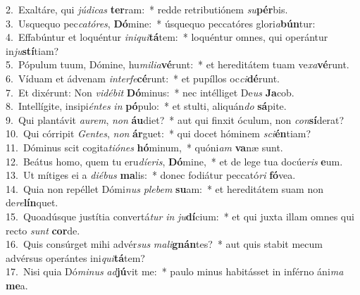 {2.~}Exaltáre, qui \textit{jú}\textit{di}\textit{cas} \textbf{ter}ram:~* redde retributiónem \textit{su}\textbf{pér}bis.\\
{3.~}Usquequo pec\textit{ca}\textit{tó}\textit{res}, \textbf{Dó}mine:~* úsquequo peccatóres glori\textit{a}\textbf{bún}tur:\\
{4.~}Effabúntur et loquéntur \textit{i}\textit{ni}\textit{qui}\textbf{tá}tem:~* loquéntur omnes, qui operántur in\textit{ju}\textbf{stí}tiam?\\
{5.~}Pópulum tuum, Dómine, hu\textit{mi}\textit{li}\textit{a}\textbf{vé}runt:~* et hereditátem tuam ve\textit{xa}\textbf{vé}runt.\\
{6.~}Víduam et ádvenam \textit{in}\textit{ter}\textit{fe}\textbf{cé}runt:~* et pupíllos oc\textit{ci}\textbf{dé}runt.\\
{7.~}Et dixérunt: Non \textit{vi}\textit{dé}\textit{bit} \textbf{Dó}minus:~* nec intélliget De\textit{us} \textbf{Ja}cob.\\
{8.~}Intellígite, insipi\textit{én}\textit{tes} \textit{in} \textbf{pó}pulo:~* et stulti, aliquán\textit{do} \textbf{sá}pite.\\
{9.~}Qui plantávit \textit{au}\textit{rem}, \textit{non} \textbf{áu}diet?~* aut qui finxit óculum, non \textit{con}\textbf{sí}derat?\\
{10.~}Qui córripit \textit{Gen}\textit{tes}, \textit{non} \textbf{ár}guet:~* qui docet hóminem \textit{sci}\textbf{én}tiam?\\
{11.~}Dóminus scit cogita\textit{ti}\textit{ó}\textit{nes} \textbf{hó}minum,~* quóni\textit{am} \textbf{va}næ sunt.\\
{12.~}Beátus homo, quem tu eru\textit{dí}\textit{e}\textit{ris}, \textbf{Dó}mine,~* et de lege tua docúe\textit{ris} \textbf{e}um.\\
{13.~}Ut mítiges ei a \textit{di}\textit{é}\textit{bus} \textbf{ma}lis:~* donec fodiátur peccató\textit{ri} \textbf{fó}vea.\\
{14.~}Quia non repéllet Dómi\textit{nus} \textit{ple}\textit{bem} \textbf{su}am:~* et hereditátem suam non de\textit{re}\textbf{lín}quet.\\
{15.~}Quoadúsque justítia convertá\textit{tur} \textit{in} \textit{ju}\textbf{dí}cium:~* et qui juxta illam omnes qui recto \textit{sunt} \textbf{cor}de.\\
{16.~}Quis consúrget mihi advér\textit{sus} \textit{ma}\textit{li}\textbf{gnán}tes?~* aut quis stabit mecum advérsus operántes ini\textit{qui}\textbf{tá}tem?\\
{17.~}Nisi quia Dó\textit{mi}\textit{nus} \textit{ad}\textbf{jú}vit me:~* paulo minus habitásset in inférno áni\textit{ma} \textbf{me}a.\\
